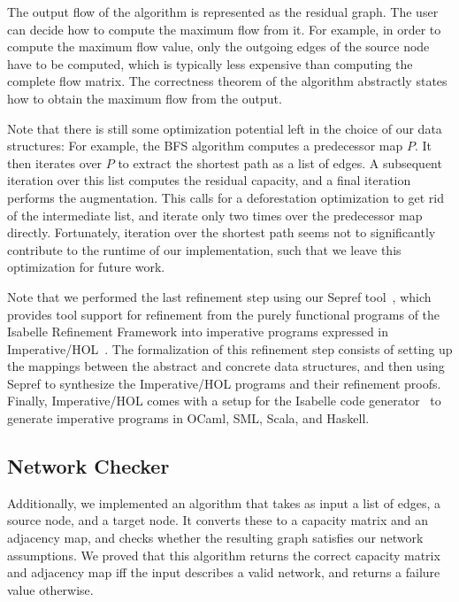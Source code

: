 \documentclass[smallcondensed]{svjour3}     %
\begin{document}
  The output flow of the algorithm is represented as the residual graph. The user can decide how to compute the maximum flow from it. For example,
  in order to compute the maximum flow value, only the outgoing edges of the source node have to be computed, which is typically less 
  expensive than computing the complete flow matrix. The correctness theorem of the algorithm abstractly states how to obtain the maximum flow from the output.

  Note that there is still some optimization potential left in the choice of our data structures: 
  For example, the BFS algorithm computes a predecessor map $P$. It then iterates over $P$ to extract the shortest path as a list of edges.
  A subsequent iteration over this list computes the residual capacity, and a final iteration performs the augmentation. 
  This calls for a deforestation optimization to get rid of the intermediate list, and iterate only two times over the predecessor map directly.
  Fortunately, iteration over the shortest path seems not to significantly contribute to the runtime of our implementation, such that 
  we leave this optimization for future work.

  Note that we performed the last refinement step using our Sepref tool~\cite{La15,La16}, which provides tool support for refinement from the
  purely functional programs of the Isabelle Refinement Framework into imperative programs expressed in Imperative/HOL~\cite{BKHEM08}.
  The formalization of this refinement step consists of setting up the mappings between the abstract and concrete data structures,
  and then using Sepref to synthesize the Imperative/HOL programs and their refinement proofs.
  Finally, Imperative/HOL comes with a setup for the Isabelle code generator~\cite{Haft09,HaNi10} to generate imperative programs in OCaml, SML, Scala, and Haskell.

  \subsection{Network Checker}
  Additionally, we implemented an algorithm that takes as input a list of edges, a source node, and a target node.
  It converts these to a capacity matrix and an adjacency map, and checks whether the resulting graph satisfies our network assumptions.
  We proved that this algorithm returns the correct capacity matrix and adjacency map iff the input describes a valid network,
  and returns a failure value otherwise.
    
\end{document}
